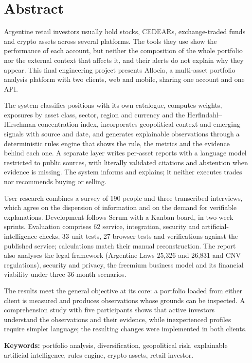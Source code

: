 \chapter*{Abstract}

Argentine retail investors usually hold stocks, CEDEARs, exchange-traded funds and crypto assets across several platforms. The tools they use show the performance of each account, but neither the composition of the whole portfolio nor the external context that affects it, and their alerts do not explain why they appear. This final engineering project presents Allocia, a multi-asset portfolio analysis platform with two clients, web and mobile, sharing one account and one API.

The system classifies positions with its own catalogue, computes weights, exposures by asset class, sector, region and currency and the Herfindahl--Hirschman concentration index, incorporates geopolitical context and emerging signals with source and date, and generates explainable observations through a deterministic rules engine that shows the rule, the metrics and the evidence behind each one. A separate layer writes per-asset reports with a language model restricted to public sources, with literally validated citations and abstention when evidence is missing. The system informs and explains; it neither executes trades nor recommends buying or selling.

User research combines a survey of 190 people and three transcribed interviews, which agree on the dispersion of information and on the demand for verifiable explanations. Development follows Scrum with a Kanban board, in two-week sprints. Evaluation comprises 62 service, integration, security and artificial-intelligence checks, 33 unit tests, 27 browser tests and verifications against the published service; calculations match their manual reconstruction. The report also analyses the legal framework (Argentine Laws 25,326 and 26,831 and CNV regulations), security and privacy, the freemium business model and its financial viability under three 36-month scenarios.

The results meet the general objective at its core: a portfolio loaded from either client is measured and produces observations whose grounds can be inspected. A comprehension study with five participants shows that active investors understand the observations and their evidence, while inexperienced profiles require simpler language; the resulting changes were implemented in both clients.

\medskip
\noindent\textbf{Keywords:} portfolio analysis, diversification, geopolitical risk, explainable artificial intelligence, rules engine, crypto assets, retail investor.
